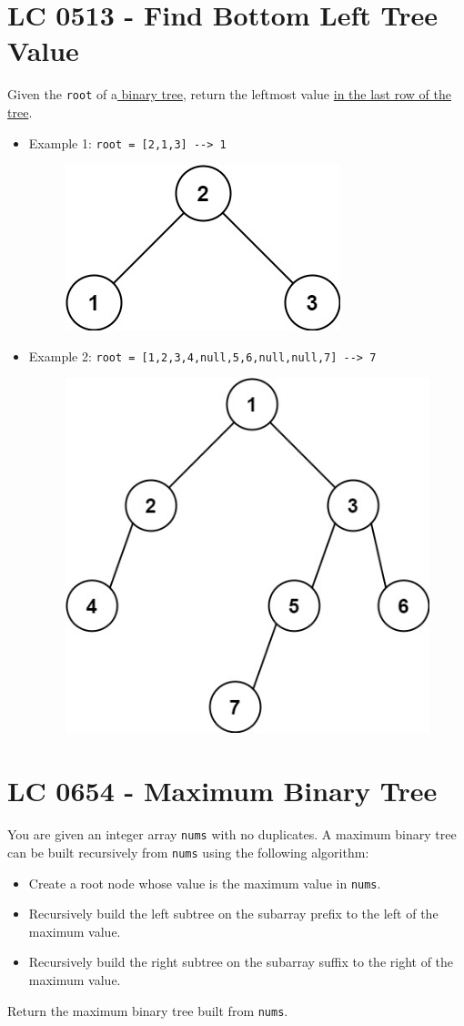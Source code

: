 \section{LC 0513 - Find Bottom Left Tree Value}
Given the {\colorbox{CodeBackground}{\lstinline|root|}} of a\ul{ binary tree}, return the leftmost value \ul{in the last row of the tree}.

\begin{itemize}
\item Example 1: {\colorbox{CodeBackground}{\lstinline|root = [2,1,3] --> 1|}}
\begin{figure}[H]
\centering
\includegraphics[width=0.25\linewidth]{images/lc0513_eg1}
\label{fig:lc0513eg1}
\end{figure}
\item Example 2: {\colorbox{CodeBackground}{\lstinline|root = [1,2,3,4,null,5,6,null,null,7] --> 7|}}
\begin{figure}[H]
\centering
\includegraphics[width=0.35\linewidth]{images/lc0513_eg2}
\label{fig:lc0513eg2}
\end{figure}
\end{itemize}

\section{LC 0654 - Maximum Binary Tree}
You are given an integer array {\colorbox{CodeBackground}{\lstinline|nums|}} with no duplicates. A maximum binary tree can be built recursively from {\colorbox{CodeBackground}{\lstinline|nums|}} using the following algorithm:
\begin{itemize}
\item Create a root node whose value is the maximum value in {\colorbox{CodeBackground}{\lstinline|nums|}}.
\item Recursively build the left subtree on the subarray prefix to the left of the maximum value.
\item Recursively build the right subtree on the subarray suffix to the right of the maximum value.
\end{itemize}
Return the maximum binary tree built from {\colorbox{CodeBackground}{\lstinline|nums|}}.\\

